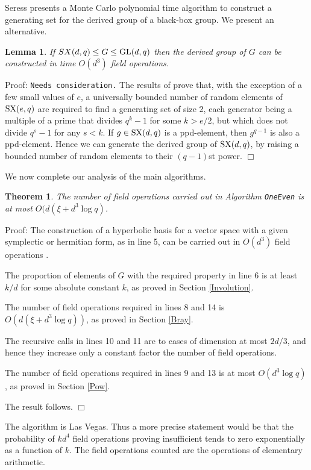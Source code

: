 \documentclass[12pt]{article}
\newtheorem{lemma}[definition]{Lemma}
\newtheorem{theorem}[definition]{Theorem}
\newenvironment{proof}{\normalsize {\sc Proof}:}{{\hfill $\Box$ \\}}
\def\GL{{\rm GL}}
\def\SX{{\rm SX}}
\begin{document}
Seress \cite[Theorem 2.3.9]{Seress03} presents 
a Monte Carlo polynomial time
algorithm to construct a generating set for the 
derived group of a black-box group. 
We present an  alternative.
\begin{lemma}
If $SX(d, q) \leq G \leq \GL(d, q)$ then  
the derived group of $G$ 
can be constructed in time $O(d^3)$ field operations.
\end{lemma}
\begin{proof}
{\tt Needs consideration.} 
The results of \cite{NP} prove that, 
with the exception of a few
small values of $e$, a universally  bounded number of random elements
of $\SX(e,q)$ are required to find a generating set of size 2, each
generator being a multiple of a prime that divides $q^k-1$ for some
$k>e/2$, but which does not divide $q^s-1$ for any $s<k$. 
If $g \in \SX(d, q)$ is a ppd-element, 
then $g^{q - 1}$ is also a ppd-element.
Hence we can generate the derived group of $\SX(d, q)$, by raising
a bounded number of random elements to their $(q -1)$st power. 
\end{proof}

We now complete our analysis of the main algorithms.
\begin{theorem}\label{Theorem1}  
The number of field operations carried out in
Algorithm {\tt OneEven} is at most  
$O(d (\xi + d^3 \log q)$.
\end{theorem}
\begin{proof} 
The construction of a hyperbolic basis for a vector space with a given
symplectic or hermitian form, as in line 5, can be carried out
in $O(d^3)$ field operations \cite[Chapter 2]{Grove02}.

The proportion of elements of $G$ with the required property in line 6
is at least $k/d$ for some absolute constant $k$, as proved in Section
\ref{Involution}.

The number of field operations required in lines 8 and 14 is 
$O(d(\xi + d^3 \log q))$,
as proved in Section \ref{Bray}.

The recursive calls in  lines 10 and 11 are to cases of dimension at
most $2d/3$, and hence they increase only a constant factor 
the number of field operations. 

The number of field operations required in lines 9 and 13 is at most 
$O(d^3\log q)$, as proved in Section \ref{Pow}. 

The result follows.
\end{proof}

The algorithm is Las Vegas. Thus a more precise statement
would be that the probability of $kd^4$ field operations proving
insufficient tends to zero exponentially as a function of $k$. 
The field operations counted are the operations of elementary
arithmetic. 
\end{document}

